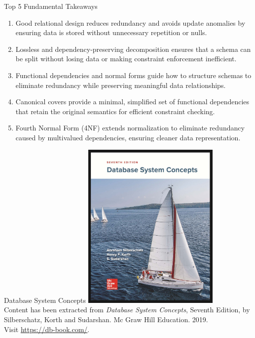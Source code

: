 \documentclass{beamer}
\begin{document}
\begin{frame}{Top 5 Fundamental Takeaways}
    \small
    \begin{enumerate} \pause
        \item[5] Good relational design reduces redundancy and avoids update anomalies by ensuring data is stored without unnecessary repetition or nulls. \pause

        \item[4] Lossless and dependency-preserving decomposition ensures that a schema can be split without losing data or making constraint enforcement inefficient. \pause

        \item[3] Functional dependencies and normal forms guide how to structure schemas to eliminate redundancy while preserving meaningful data relationships. \pause

        \item[2] Canonical covers provide a minimal, simplified set of functional dependencies that retain the original semantics for efficient constraint checking. \pause

        \item[1] Fourth Normal Form (4NF) extends normalization to eliminate redundancy caused by multivalued dependencies, ensuring cleaner data representation.
    \end{enumerate}
\end{frame}

\begin{frame}{Database System Concepts}
    \centering
    \includegraphics[width=0.5\textwidth]{figures/book_cover.jpg} \\
    \vspace{5mm}
    {
        \tiny
        Content has been extracted from \textit{Database System Concepts}, Seventh Edition, by Silberschatz, Korth and Sudarshan. Mc Graw Hill Education. 2019.\\
        Visit \url{https://db-book.com/}.\\
    }
\end{frame}
\end{document}
